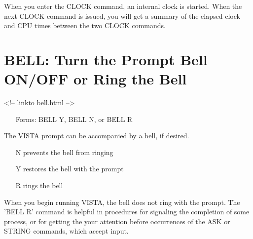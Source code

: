 When you enter the CLOCK command, an internal clock is started. When the
next CLOCK command is issued, you will get a summary of the elapsed clock
and CPU times between the two CLOCK commands.

\section{BELL: Turn the Prompt Bell ON/OFF or Ring the Bell }
\begin{rawhtml}
<!-- linkto bell.html -->
\end{rawhtml}
\begin{itemize}
  \item[Forms: BELL Y, BELL N, or BELL R\hfill]{}
\end{itemize}

The VISTA prompt can be accompanied by a bell, if desired.
\begin{itemize}
  \item[N\hfill]{prevents the bell from ringing}
  \item[Y\hfill]{restores the bell with the prompt}
  \item[R\hfill]{rings the bell}
\end{itemize}
When you begin running VISTA, the bell does not ring with the prompt. The
'BELL R' command is helpful in procedures for signaling the completion of
some process, or for getting the your attention before occurrences of the
ASK or STRING commands, which accept input.

